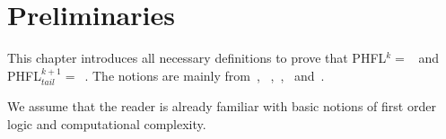 \chapter{Preliminaries}
\label{ch:preliminaries}
This chapter introduces all necessary definitions to prove that PHFL$^k =$~ and
PHFL$^{k+1}_{tail} =$~. The notions are mainly from~\cite{immerman1999descriptive},
~\cite{papadimitriou1994complexity},~\cite{otto1999bisimulation},~\cite{freireMartins2011descriptive}
and~\cite{lange2014capturing}.

We assume that the reader is already familiar with basic notions of first order logic and computational complexity.







